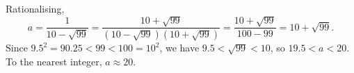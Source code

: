 Rationalising,
\[a=\dfrac{1}{10-\sqrt{99}}=\dfrac{10+\sqrt{99}}{(10-\sqrt{99})(10+\sqrt{99})}=\dfrac{10+\sqrt{99}}{100-99}=10+\sqrt{99}.\]
Since $9.5^2=90.25<99<100=10^2$, we have $9.5<\sqrt{99}<10$, so $19.5<a<20$. To the nearest integer, $a\approx\boxed{20}$.
